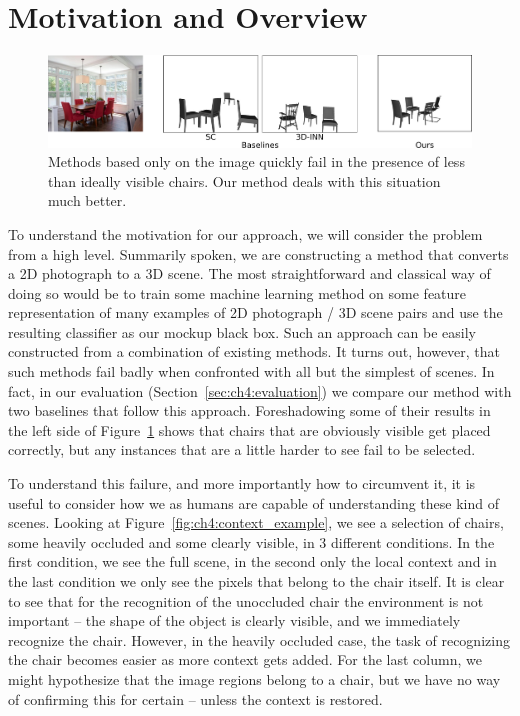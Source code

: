 \documentclass[10pt,twocolumn,letterpaper]{article}
\begin{document}
\section{Motivation and Overview}
\begin{figure}[h!tb]
    \includegraphics[width=\linewidth]{figures/baseline_foreshadowing/baseline_foreshadowing}
    \caption[Baseline sample]{Methods based only on the image quickly fail in the presence of less than ideally visible chairs. Our method deals with this situation much better.}
    \label{fig:ch4:baseline_foreshadowing}
\end{figure}
To understand the motivation for our approach, we will consider the problem
from a high level.  Summarily spoken, we are constructing a method that
converts a 2D photograph to a 3D scene.  The most straightforward and classical
way of doing so would be to train some machine learning method on some feature
representation of many examples of 2D photograph / 3D scene pairs and use the
resulting classifier as our mockup black box. Such an approach can be easily
constructed from a combination of existing methods. It turns out, however, that
such methods fail badly when confronted with all but the simplest of scenes.
In fact, in our evaluation (Section~\ref{sec:ch4:evaluation}) we compare our
method with two baselines that follow this approach. Foreshadowing some of
their results in the left side of Figure~\ref{fig:ch4:baseline_foreshadowing}
shows that chairs that are obviously visible get placed correctly, but any
instances that are a little harder to see fail to be selected.

To understand this failure, and more importantly how to circumvent it, it is
useful to consider how we as humans are capable of understanding these kind of
scenes. Looking at Figure~\ref{fig:ch4:context_example}, we see a selection of chairs, some
heavily occluded and some clearly visible, in 3 different conditions.  In the
first condition, we see the full scene, in the second only the local context
and in the last condition we only see the pixels that belong to the chair
itself. It is clear to see that for the recognition of the unoccluded chair the
environment is not important -- the shape of the object is clearly visible, and
we immediately recognize the chair. However, in the heavily occluded case, the
task of recognizing the chair becomes easier as more context gets added. For
the last column, we might hypothesize that the image regions belong to a chair,
but we have no way of confirming this for certain -- unless the context is
restored.
\end{document}
